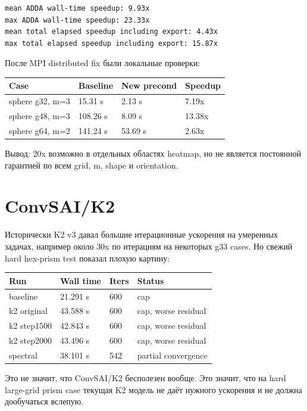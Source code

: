 \documentclass[11pt,a4paper,oneside]{book}
\begin{document}
\begin{lstlisting}
mean ADDA wall-time speedup: 9.93x
max ADDA wall-time speedup: 23.33x
mean total elapsed speedup including export: 4.43x
max total elapsed speedup including export: 15.87x
\end{lstlisting}

После MPI distributed fix были локальные проверки:

\begin{longtable}{p{}p{}p{}p{}}
\toprule
Case & Baseline & New precond & Speedup \\
\midrule
sphere g32, m=3 & 15.31 s & 2.13 s & 7.19x \\
sphere g48, m=3 & 108.26 s & 8.09 s & 13.38x \\
sphere g64, m=2 & 141.24 s & 53.69 s & 2.63x \\
\bottomrule
\end{longtable}

Вывод: 20x возможно в отдельных областях heatmap, но не является постоянной
гарантией по всем grid, m, shape и orientation.

\section{ConvSAI/K2}

Исторически K2 v3 давал большие итерационные ускорения на умеренных задачах,
например около 30x по итерациям на некоторых g33 cases. Но свежий hard
hex-prism test показал плохую картину:

\begin{longtable}{p{}p{}p{}p{}}
\toprule
Run & Wall time & Iters & Status \\
\midrule
baseline & 21.291 s & 600 & cap \\
k2 original & 43.588 s & 600 & cap, worse residual \\
k2 step1500 & 42.843 s & 600 & cap, worse residual \\
k2 step2000 & 43.496 s & 600 & cap, worse residual \\
spectral & 38.101 s & 542 & partial convergence \\
\bottomrule
\end{longtable}

Это не значит, что ConvSAI/K2 бесполезен вообще. Это значит, что на hard
large-grid prism case текущая K2 модель не даёт нужного ускорения и не должна
дообучаться вслепую.
\end{document}
